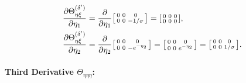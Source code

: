 \documentclass{article}
\begin{document}
\begin{align}
  \frac{\partial \Theta_{\eta\xi}^{(\delta')}}{\partial \eta_1} & = \frac{\partial}{\partial \eta_1} \begin{bsmallmatrix} 0 & 0 & 0 \\ 0 & 0 & -1/\sigma \end{bsmallmatrix} = \begin{bsmallmatrix} 0 & 0 & 0 \\ 0 & 0 & 0 \end{bsmallmatrix},                                   \\
  \frac{\partial \Theta_{\eta\xi}^{(\delta')}}{\partial \eta_2} & = \frac{\partial}{\partial \eta_2} \begin{bsmallmatrix} 0 & 0 & 0 \\ 0 & 0 & -e^{-\eta_2} \end{bsmallmatrix} = \begin{bsmallmatrix} 0 & 0 & 0 \\ 0 & 0 & e^{-\eta_2} \end{bsmallmatrix} = \begin{bsmallmatrix} 0 & 0 & 0 \\ 0 & 0 & 1/\sigma \end{bsmallmatrix}.
\end{align}

\paragraph{Third Derivative $\Theta_{\eta\eta\eta}$:}
\end{document}
